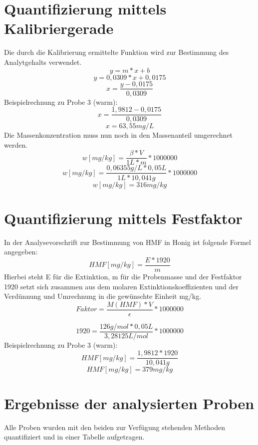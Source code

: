 
\section{Quantifizierung mittels Kalibriergerade}
Die durch die Kalibrierung ermittelte Funktion wird zur Bestimmung des Analytgehalts verwendet.
	\[y=m*x+b\]
	\[y=0,0309*x+0,0175\]
	\[x=\frac{ y-0,0175 }{ 0,0309 }\]
Beispielrechnung zu Probe 3 (warm):
	\[x=\frac{ 1,9812-0,0175 }{ 0,0309 }\]
	\[x=63,55mg/L\]
Die Massenkonzentration muss nun noch in den Massenanteil umgerechnet werden.
	\[w[mg/kg]=\frac{ \beta*V }{ 1L * m }*1000000\]
	\[w[mg/kg]=\frac{ 0,06355g/L*0,05L }{ 1L * 10,041g }*1000000\]
	\[w[mg/kg]=316mg/kg\]

	
\section{Quantifizierung mittels Festfaktor}
In der Analysevorschrift zur Bestimmung von HMF in Honig ist folgende Formel angegeben:
	\[HMF[mg/kg]=\frac{ E * 1920 }{ m }\]
Hierbei steht E für die Extinktion, m für die Probenmasse und der Festfaktor 1920 setzt sich zusammen aus dem molaren Extinktionskoeffizienten und der Verdünnung und Umrechnung in die gewünschte Einheit mg/kg.
	\[Faktor=\frac{ M(HMF)*V }{ \epsilon }*1000000\]
	
	\[1920=\frac{ 126g/mol * 0,05L }{ 3,28125L/mol }*1000000\]
Beispielrechnung zu Probe 3 (warm):
	\[HMF[mg/kg]=\frac{ 1,9812 * 1920 }{ 10,041g }\]
	\[HMF[mg/kg]=379mg/kg\]
\section{Ergebnisse der analysierten Proben}
Alle Proben wurden mit den beiden zur Verfügung stehenden Methoden quantifiziert und in einer Tabelle aufgetragen.

